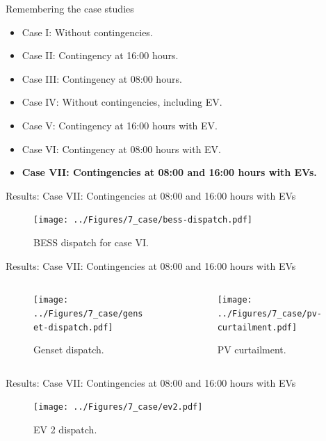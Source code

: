 \documentclass[10pt, aspectratio=1610]{beamer}
\begin{document}
\begin{frame}{Remembering the case studies}
    \begin{itemize}
        \item Case I: Without contingencies.
        \item Case II: Contingency at 16:00 hours.
        \item Case III: Contingency at 08:00 hours.
        \item Case IV: Without contingencies, including EV.
        \item Case V: Contingency at 16:00 hours with EV.
        \item Case VI: Contingency at 08:00 hours with EV.
        \item \textbf{Case VII: Contingencies at 08:00 and 16:00 hours with EVs.}
    \end{itemize}
\end{frame}


\begin{frame}{Results: Case VII: Contingencies at 08:00 and 16:00 hours with EVs}
\begin{figure}
    \texttt{[image: ../Figures/7\_case/bess-dispatch.pdf]}
    \caption{BESS dispatch for case VI.}
\end{figure}
\end{frame}

\begin{frame}{Results: Case VII: Contingencies at 08:00 and 16:00 hours with EVs}
    \begin{columns}
    \begin{column}[c]{0.5\textwidth}
        \centering
        \begin{figure}
            \texttt{[image: ../Figures/7\_case/genset-dispatch.pdf]}
            \caption{Genset dispatch.}
        \end{figure}  
    \end{column}
    \begin{column}[c]{0.5\textwidth}
        \centering
        \begin{figure}
            \texttt{[image: ../Figures/7\_case/pv-curtailment.pdf]}
            \caption{PV curtailment.}
        \end{figure}  
    \end{column}
    \end{columns}
\end{frame}


\begin{frame}{Results: Case VII: Contingencies at 08:00 and 16:00 hours with EVs}
\begin{figure}
    \texttt{[image: ../Figures/7\_case/ev2.pdf]}
    \caption{EV 2 dispatch.}
\end{figure}
\end{frame}
\end{document}

